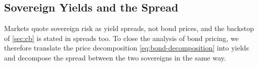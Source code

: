 %
%
%
%


\subsection{Sovereign Yields and the Spread}
\label{sec:spread}

Markets quote sovereign risk as yield spreads, not bond prices, and the backstop
of \cref{sec:cb} is stated in spreads too. To close the analysis of bond pricing,
we therefore translate the price decomposition \eqref{eq:bond-decomposition} into
yields and decompose the spread between the two sovereigns in the same way.


